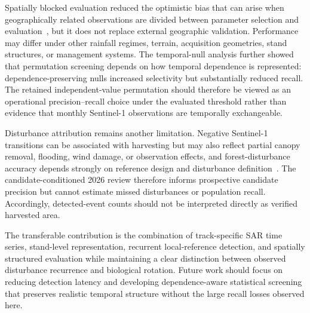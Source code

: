 Spatially blocked evaluation reduced the optimistic bias that can arise when geographically related observations are divided between parameter selection and evaluation~\citep{Roberts2017SpatialCV}, but it does not replace external geographic validation. Performance may differ under other rainfall regimes, terrain, acquisition geometries, stand structures, or management systems. The temporal-null analysis further showed that permutation screening depends on how temporal dependence is represented: dependence-preserving nulls increased selectivity but substantially reduced recall. The retained independent-value permutation should therefore be viewed as an operational precision--recall choice under the evaluated threshold rather than evidence that monthly Sentinel-1 observations are temporally exchangeable.

Disturbance attribution remains another limitation. Negative Sentinel-1 transitions can be associated with harvesting but may also reflect partial canopy removal, flooding, wind damage, or observation effects, and forest-disturbance accuracy depends strongly on reference design and disturbance definition~\citep{RodriguezPaulino2024Review}. The candidate-conditioned 2026 review therefore informs prospective candidate precision but cannot estimate missed disturbances or population recall. Accordingly, detected-event counts should not be interpreted directly as verified harvested area.

The transferable contribution is the combination of track-specific SAR time series, stand-level representation, recurrent local-reference detection, and spatially structured evaluation while maintaining a clear distinction between observed disturbance recurrence and biological rotation. Future work should focus on reducing detection latency and developing dependence-aware statistical screening that preserves realistic temporal structure without the large recall losses observed here.



